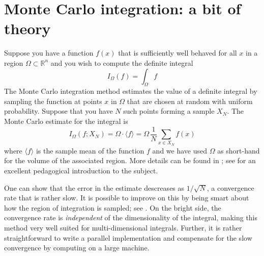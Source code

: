 %
%

\section{Monte Carlo integration: a bit of theory}
\label{sec:montecarlo}

Suppose you have a function $f(x)$ that is sufficiently well behaved for
all $x$ in a region $\Omega \subset \mathbb{R}^{n}$ and you wish to compute the
definite integral
%
\begin{equation}
  I_{\Omega} (f)
  =
  \int_{\Omega} f
\label{eq:integral}
\end{equation}
%
The Monte Carlo integration method estimates the value of a definite integral by sampling
the function at points $x$ in $\Omega$ that are chosen at random with uniform
probability. Suppose that you have $N$ such points forming a sample $X_{N}$. The Monte
Carlo estimate for the integral is
%
\begin{equation}
  I_{\Omega} (f; X_{N})
  =
  \Omega \cdot \langle f \rangle
  =
  \Omega \, \frac{1}{N} \sum_{x \in X_{N}} f(x)
\label{eq:mc-estimate}
\end{equation}
%
where $\langle f \rangle$ is the sample mean of the function $f$ and we have used $\Omega$
as short-hand for the volume of the associated region. More details can be found in
\citep{hammersley,ueberhuber}; see \cite{weinzierl} for an excellent pedagogical
introduction to the subject.

One can show that the error in the estimate descreases as $1/\sqrt{N}$, a convergence rate that
is rather slow. It is possible to improve on this by being smart about how the region of
integration is sampled; see \cite{lepage-78,lepage-80,press}. On the bright side, the
convergence rate is {\em independent} of the dimensionality of the integral, making this method
very well suited for multi-dimensional integrals. Further, it is rather straightforward to
write a parallel implementation and compensate for the slow convergence by computing on a large
machine.

